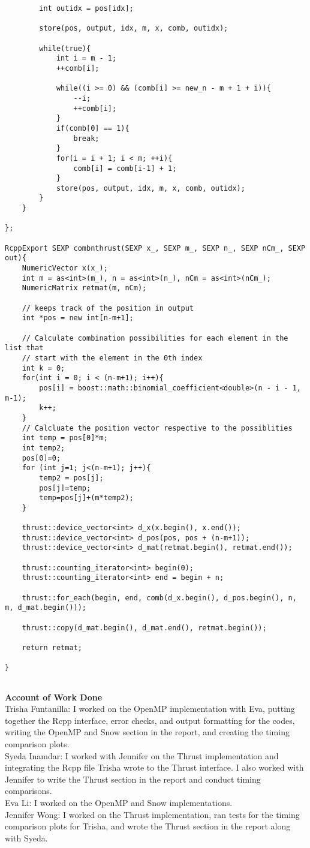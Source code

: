 {\begin{lstlisting}
        int outidx = pos[idx];
        
		store(pos, output, idx, m, x, comb, outidx);

		while(true){
			int i = m - 1;
			++comb[i];
	
			while((i >= 0) && (comb[i] >= new_n - m + 1 + i)){
				--i;
				++comb[i];
			}
			if(comb[0] == 1){
				break;
			}
			for(i = i + 1; i < m; ++i){
				comb[i] = comb[i-1] + 1;
			}
            store(pos, output, idx, m, x, comb, outidx);
		}
	}

};

RcppExport SEXP combnthrust(SEXP x_, SEXP m_, SEXP n_, SEXP nCm_, SEXP out){
	NumericVector x(x_);
	int m = as<int>(m_), n = as<int>(n_), nCm = as<int>(nCm_);
	NumericMatrix retmat(m, nCm);

    // keeps track of the position in output
    int *pos = new int[n-m+1];
    
    // Calculate combination possibilities for each element in the list that
    // start with the element in the 0th index
    int k = 0;
    for(int i = 0; i < (n-m+1); i++){
        pos[i] = boost::math::binomial_coefficient<double>(n - i - 1, m-1);
        k++;
    }
    // Calcluate the position vector respective to the possiblities
    int temp = pos[0]*m;
    int temp2;
    pos[0]=0;
    for (int j=1; j<(n-m+1); j++){
        temp2 = pos[j];
        pos[j]=temp;
        temp=pos[j]+(m*temp2);
    }
	
	thrust::device_vector<int> d_x(x.begin(), x.end());
    thrust::device_vector<int> d_pos(pos, pos + (n-m+1));
	thrust::device_vector<int> d_mat(retmat.begin(), retmat.end());
    
	thrust::counting_iterator<int> begin(0);
	thrust::counting_iterator<int> end = begin + n;

	thrust::for_each(begin, end, comb(d_x.begin(), d_pos.begin(), n, m, d_mat.begin()));

	thrust::copy(d_mat.begin(), d_mat.end(), retmat.begin());
	
	return retmat;
    
}


\end{lstlisting}
}

\newpage
\textbf{\Large{Account of Work Done}}\\
\null
Trisha Funtanilla: I worked on the OpenMP implementation with Eva, putting together the Rcpp interface, error checks, and output formatting for the codes, writing the OpenMP and Snow section in the report, and creating the timing comparison plots.
\\
\null
Syeda Inamdar: I worked with Jennifer on the Thrust implementation and integrating the Rcpp file Trisha wrote to the Thrust interface. I also worked with Jennifer to write the Thrust section in the report and conduct timing comparisons.
\\
\null
Eva Li: I worked on the OpenMP and Snow implementations.
\\
\null
Jennifer Wong: I worked on the Thrust implementation, ran tests for the timing comparison plots for Trisha, and wrote the Thrust section in the report along with Syeda.




